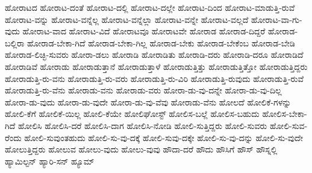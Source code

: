 {ಹೋರಾಟದ
ಹೋರಾಟ-ದಂತೆ
ಹೋರಾಟ-ದಲ್ಲಿ
ಹೋರಾಟ-ದಲ್ಲೇ
ಹೋರಾಟ-ದಿಂದ
ಹೋರಾಟ-ಮಾಡುತ್ತಿ-ರುವೆ
ಹೋರಾಟ-ವನ್ನು
ಹೋರಾಟ-ವನ್ನೆಲ್ಲ
ಹೋರಾಟ-ವನ್ನೆಲ್ಲಾ
ಹೋರಾಟ-ವನ್ನೇ
ಹೋರಾಟ-ವಲ್ಲದೆ
ಹೋರಾಟ-ವಾ-ಗು-ವುದು
ಹೋರಾಟ-ವಾದ
ಹೋರಾಟ-ವಿದೆ
ಹೋರಾಟವೂ
ಹೋರಾಟವೇ
ಹೋರಾಡ
ಹೋರಾಡ-ದಿದ್ದರೆ
ಹೋರಾಡ-ಬಲ್ಲಿರಾ
ಹೋರಾಡ-ಬೇಕಾ-ಗಿದೆ
ಹೋರಾಡ-ಬೇಕಾ-ಗಿಲ್ಲ
ಹೋರಾಡ-ಬೇಕು
ಹೋರಾಡ-ಬೇಕೆಂಬ
ಹೋರಾಡ-ಬೇಡಿ
ಹೋರಾಡ-ಲಿಚ್ಛಿ-ಸುವರು
ಹೋರಾ-ಡಲು
ಹೋರಾಡಿ
ಹೋರಾಡಿತು
ಹೋರಾಡಿ-ದರು
ಹೋರಾಡಿ-ದರೂ
ಹೋರಾಡಿದೆ
ಹೋರಾಡಿವೆ
ಹೋರಾಡು
ಹೋರಾಡುತ್ತಾನೆ
ಹೋರಾಡುತ್ತಾಳೆ
ಹೋರಾಡುತ್ತಿತ್ತು
ಹೋರಾಡುತ್ತಿತ್ತೋ
ಹೋರಾಡುತ್ತಿದ್ದರು
ಹೋರಾಡುತ್ತಿ-ರು-ವನು
ಹೋರಾಡುತ್ತಿ-ರು-ವರು
ಹೋರಾಡುತ್ತಿ-ರು-ವಿರಿ
ಹೋರಾಡುತ್ತಿ-ರುವುದು
ಹೋರಾಡುತ್ತಿ-ರುವೆ
ಹೋರಾಡುತ್ತಿ-ರು-ವೆನು
ಹೋರಾಡು-ವನು
ಹೋರಾಡು-ವರು
ಹೋರಾ-ಡು-ವು-ದನ್ನೇ
ಹೋರಾ-ಡು-ವು-ದಿಲ್ಲ
ಹೋರಾ-ಡು-ವುದು
ಹೋರಾ-ಡು-ವುದೇ
ಹೋರಾ-ಡು-ವು-ವೆವು
ಹೋರಾಡು-ವೆನು
ಹೋಲದೆ
ಹೋಲಿಕೆ-ಗಳನ್ನು
ಹೋಲಿ-ಕೆಗೆ
ಹೋಲಿಕೆ-ಯಿಲ್ಲ
ಹೋಲಿ-ಕೆಯೇ
ಹೋಲಿಘೋಸ್ಟ್
ಹೋಲಿಸ-ಬಲ್ಲೆ
ಹೋಲಿಸ-ಬಹುದು
ಹೋಲಿಸ-ಬೇಕಾ-ಗಿದೆ
ಹೋಲಿಸಿ
ಹೋಲಿಸಿ-ದರೆ
ಹೋಲಿಸಿ-ದಾಗ
ಹೋಲಿಸಿ-ನೋಡಿ
ಹೋಲಿ-ಸುತ್ತಿದ್ದರು
ಹೋಲಿ-ಸುವರು
ಹೋಲಿ-ಸುವ-ರೆಂದು
ಹೋಲಿ-ಸುವುಂತಹುದು
ಹೋಲಿ-ಸು-ವು-ದಕ್ಕೆ
ಹೋಲಿ-ಸುವು-ದಕ್ಕೇ
ಹೋಲಿ-ಸು-ವು-ದನ್ನು
ಹೋಲಿ-ಸು-ವುದೇ
ಹೋಲುತ್ತಿದ್ದರು
ಹೋಲುವ
ಹೋಲು-ವುದು
ಹೋಲು-ವುವು
ಹೌದಾ-ದರೆ
ಹೌದು
ಹೌಸಿಗೆ
ಹೌಸ್
ಹೌಸ್ನಲ್ಲಿ
ಹ್ಯಾಮಿಲ್ಟನ್
ಹ್ಯಾರಿ-ಸನ್
ಹ್ಯೂಮ್
}
